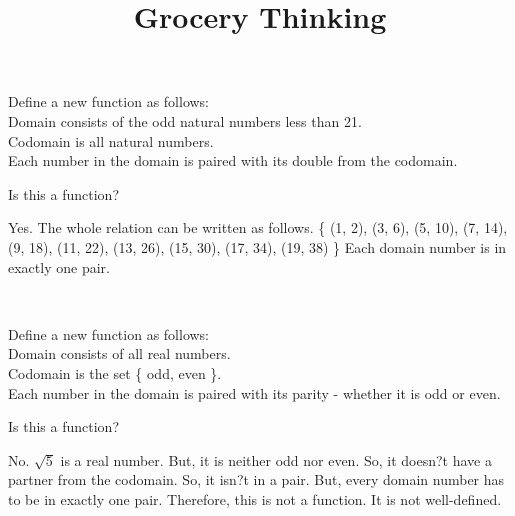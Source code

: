 \documentclass{ximera}
\title{Grocery Thinking}
\begin{document}
\begin{abstract}
\end{abstract}

\maketitle


\begin{question}

Define a new function as follows: \\
Domain consists of the odd natural numbers less than 21.\\
Codomain is all natural numbers.\\
Each number in the domain is paired with its double from the codomain.

Is this a function?
\begin{multipleChoice}
\end{multipleChoice}
\begin{feedback}
Yes. The whole relation can be written as follows.
\{ (1, 2), (3, 6), (5, 10), (7, 14), (9, 18), (11, 22), (13, 26), (15, 30), (17, 34), (19, 38) \}
Each domain number is in exactly one pair.
\end{feedback}


\end{question}


\quad \\



\begin{question}

Define a new function as follows: \\
Domain consists of all real numbers. \\
Codomain is the set \{ odd, even \}. \\
Each number in the domain is paired with its parity - whether it is odd or even.

Is this a function?
\begin{multipleChoice}
\end{multipleChoice}
\begin{feedback}
No. $\sqrt{5}$ is a real number. But, it is neither odd nor even. So, it doesn?t have a partner from the codomain. So, it isn?t in a pair. But, every domain number has to be in exactly one pair.
Therefore, this is not a function. It is not well-defined.
\end{feedback}


\end{question}
\end{document}
